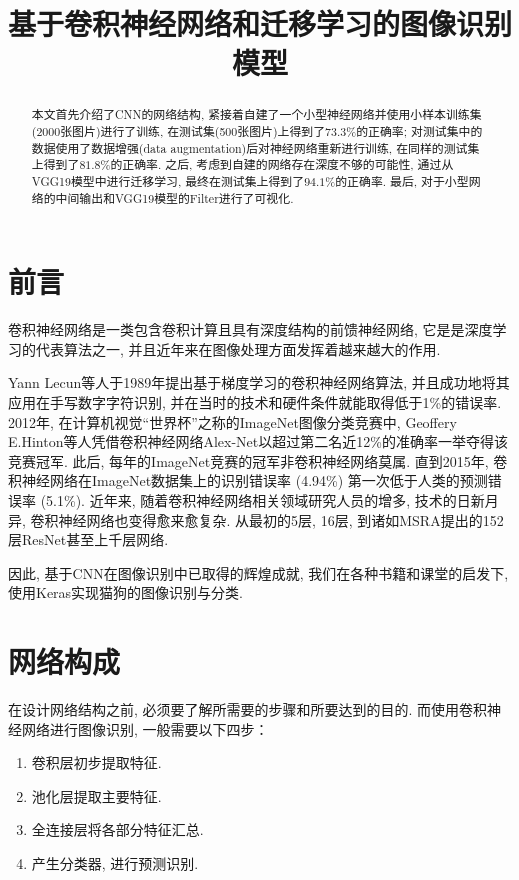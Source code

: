 \documentclass[lang=cn,11pt]{elegantpaper}
\title{基于卷积神经网络和迁移学习的图像识别模型}
\date{}
\begin{document}

\newpage
\maketitle

\vspace{-25pt}
\begin{abstract}
	本文首先介绍了CNN的网络结构, 紧接着自建了一个小型神经网络并使用小样本训练集(2000张图片)进行了训练, 在测试集(500张图片)上得到了$73.3\%$的正确率; 对测试集中的数据使用了数据增强(data augmentation)后对神经网络重新进行训练, 在同样的测试集上得到了$81.8\%$的正确率. 之后, 考虑到自建的网络存在深度不够的可能性, 通过从VGG19模型中进行迁移学习, 最终在测试集上得到了$94.1\%$的正确率. 最后, 对于小型网络的中间输出和VGG19模型的Filter进行了可视化. 
\end{abstract}
	
\tableofcontents
\thispagestyle{empty}
\newpage
\normalsize
{}


\section{前言}
卷积神经网络是一类包含卷积计算且具有深度结构的前馈神经网络, 它是是深度学习的代表算法之一, 并且近年来在图像处理方面发挥着越来越大的作用. 

Yann Lecun等人于1989年提出基于梯度学习的卷积神经网络算法, 并且成功地将其应用在手写数字字符识别, 并在当时的技术和硬件条件就能取得低于1\%的错误率. 2012年, 在计算机视觉“世界杯”之称的ImageNet图像分类竞赛中, Geoffery E.Hinton等人凭借卷积神经网络Alex-Net以超过第二名近12\%的准确率一举夺得该竞赛冠军. 此后, 每年的ImageNet竞赛的冠军非卷积神经网络莫属. 直到2015年, 卷积神经网络在ImageNet数据集上的识别错误率 (4.94\%) 第一次低于人类的预测错误率 (5.1\%). 近年来, 随着卷积神经网络相关领域研究人员的增多, 技术的日新月异, 卷积神经网络也变得愈来愈复杂. 从最初的5层, 16层, 到诸如MSRA提出的152层ResNet甚至上千层网络. 

因此, 基于CNN在图像识别中已取得的辉煌成就, 我们在各种书籍和课堂的启发下, 使用Keras实现猫狗的图像识别与分类. 


\section{网络构成}
在设计网络结构之前, 必须要了解所需要的步骤和所要达到的目的. 而使用卷积神经网络进行图像识别, 一般需要以下四步：

\begin{enumerate}
	\item 卷积层初步提取特征.
	\item 池化层提取主要特征.
	\item 全连接层将各部分特征汇总.
	\item 产生分类器, 进行预测识别.
\end{enumerate}
\end{document}
